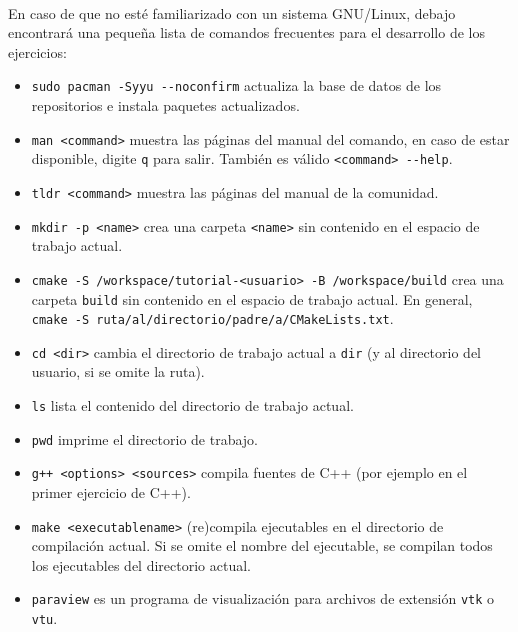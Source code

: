 \documentclass[9pt,a3paper]{scrartcl}
\begin{document}
\

En caso de que no esté familiarizado con un sistema GNU/Linux, debajo
encontrará una pequeña lista de comandos frecuentes para el
desarrollo de los ejercicios:
\begin{itemize}
	\item

	      \verb!sudo pacman -Syyu --noconfirm! actualiza la base de
	      datos de los repositorios e instala paquetes actualizados.

	\item

	      \verb!man <command>! muestra las páginas del manual del
	      comando, en caso de estar disponible, digite \verb!q! para
	      salir.
	      También es válido \verb!<command> --help!.

	\item

	      \verb!tldr <command>! muestra las páginas del manual de la
	      comunidad.

	\item

	      \verb!mkdir -p <name>! crea una carpeta \verb!<name>! sin
	      contenido en el espacio de trabajo actual.

	\item

	      \verb!cmake -S /workspace/tutorial-<usuario> -B /workspace/build!
	      crea una carpeta
	      \verb!build! sin contenido en el espacio de trabajo actual.
	      En general, \verb!cmake -S ruta/al/directorio/padre/a/CMakeLists.txt!.

	\item

	      \verb!cd <dir>! cambia el directorio de trabajo actual
	      a \verb!dir! (y al directorio del usuario, si se omite la ruta).

	\item

	      \verb!ls! lista el contenido del directorio de trabajo actual.

	\item

	      \verb!pwd! imprime el directorio de trabajo.

	\item

	      \verb!g++ <options> <sources>! compila fuentes de C++
	      (por ejemplo en el primer ejercicio de C++).

	\item

	      \verb!make <executablename>! (re)compila ejecutables en el
	      directorio de compilación actual.
	      Si se omite el nombre del ejecutable, se compilan todos los
	      ejecutables del directorio actual.

	\item

	      \verb!paraview! es un programa de visualización para archivos
	      de extensión
	      \verb!vtk! o \verb!vtu!.
\end{itemize}
\end{document}
